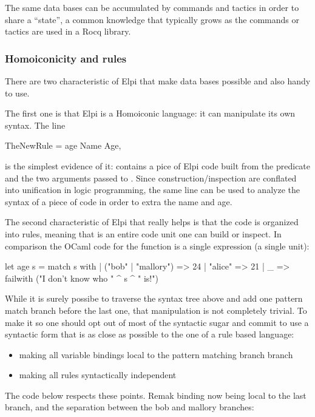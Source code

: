 \documentclass[a4paper, 11pt]{book}
\begin{document}
The same data bases can be accumulated by commands and tactics in order
to share a ``state'', a common knowledge that typically grows as the
commands or tactics are used in a Rocq library.

\subsubsection{Homoiconicity and rules}

There are two characteristic of Elpi that make data bases possible and also
handy to use.

The first one is that Elpi is a Homoiconic language: it can manipulate its own
syntax. The line

\begin{elpicode}
TheNewRule = age Name Age,
\end{elpicode}

is the simplest evidence of it:  contains a pice
of Elpi code built from the  predicate and the two arguments
passed to . Since construction/inspection are conflated
into unification in logic programming, the same line can be used to analyze the
syntax of a piece of code in order to extra the name and age.

The second characteristic of Elpi that really helps is that the code is
organized into rules, meaning that  is an entire code
unit one can build or inspect. In comparison the OCaml code for the
 function is a single expression (a single unit):

\begin{ocamlcode}
let age s =
  match s with
  | ("bob" | "mallory") => 24
  | "alice" => 21
  | _ => failwith ("I don't know who " ^ s ^ " is!")
\end{ocamlcode}

While it is surely possibe to traverse the syntax tree above and add one
pattern match branch before the last one, that manipulation is not completely
trivial. To make it so one should opt out of most of the syntactic sugar and
commit to use a syntactic form that is as close as possible to the one
of a rule based language:
\begin{itemize}
  \item making all variable bindings local to the pattern matching branch branch
  \item making all rules syntactically independent
\end{itemize}

The code below respects these points. Remak  binding now
being local to the last branch, and the separation between the bob and
mallory branches:
\end{document}
